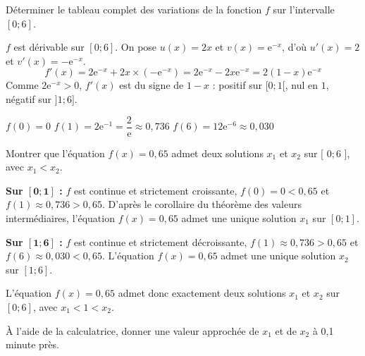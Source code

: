 \documentclass[11pt,a4paper]{article}  %
\begin{document}
	\begin{enumMet}
		\item Déterminer le tableau complet des variations de la fonction $f$ sur l'intervalle $[0 ; 6]$.
		
		\begin{corrBox}
			$f$ est dérivable sur $[0;6]$. On pose $u(x)=2x$ et $v(x)=\mathrm{e}^{-x}$, d'où $u'(x)=2$ et $v'(x)=-\mathrm{e}^{-x}$.
			\[f'(x)=2\mathrm{e}^{-x}+2x\times\left(-\mathrm{e}^{-x}\right)=2\mathrm{e}^{-x}-2x\mathrm{e}^{-x}=2(1-x)\mathrm{e}^{-x}\]
			Comme $2\mathrm{e}^{-x}>0$, $f'(x)$ est du signe de $1-x$ : positif sur $[0;1[$, nul en $1$, négatif sur $]1;6]$.
			
			$f(0)=0$ \qquad $f(1)=2\mathrm{e}^{-1}=\dfrac{2}{\mathrm{e}}\approx0{,}736$ \qquad $f(6)=12\mathrm{e}^{-6}\approx0{,}030$
			
			\begin{center}
			\end{center}
		\end{corrBox}
		
		\item \begin{enumMet}
			\item Montrer que l'équation $f(x)=0,65$ admet deux solutions $x_1$ et $x_2$ sur [ $0 ; 6$ ], avec $x_1<x_2$.
			
			\begin{corrBox}
				\textbf{Sur $\bm{[0;1]}$ :} $f$ est continue et strictement croissante, $f(0)=0<0{,}65$ et $f(1)\approx0{,}736>0{,}65$. D'après le corollaire du théorème des valeurs intermédiaires, l'équation $f(x)=0{,}65$ admet une unique solution $x_1$ sur $[0;1]$.
				
				\textbf{Sur $\bm{[1;6]}$ :} $f$ est continue et strictement décroissante, $f(1)\approx0{,}736>0{,}65$ et $f(6)\approx0{,}030<0{,}65$. L'équation $f(x)=0{,}65$ admet une unique solution $x_2$ sur $[1;6]$.
				
				L'équation $f(x)=0{,}65$ admet donc exactement deux solutions $x_1$ et $x_2$ sur $[0;6]$, avec $x_1<1<x_2$.
			\end{corrBox}
			
			\item À l'aide de la calculatrice, donner une valeur approchée de $x_1$ et de $x_2$ à 0,1 minute près.
			

\end{enumMet}
\end{enumMet}
\end{document}
